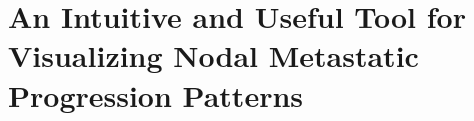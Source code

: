 \documentclass[\relativeRoot/main.tex]{subfiles}
\begin{document}
\section{An Intuitive and Useful Tool for Visualizing Nodal Metastatic Progression Patterns}
\label{sec:dicsussion:lyprox}
\end{document}
